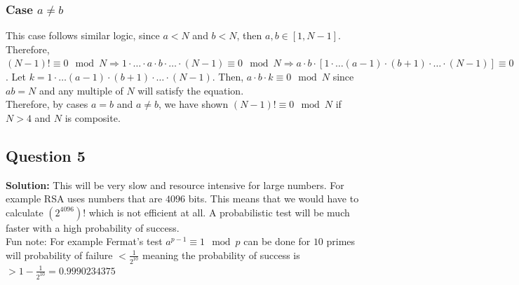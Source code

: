 \documentclass{article}
\begin{document}
\subsubsection*{Case $a\neq b$} This case follows similar logic, since $a < N$ and $b < N$, then $a,b \in [1, N-1]$. Therefore, $(N-1)! \equiv 0 \mod N \Rightarrow 1\cdot \ldots \cdot a \cdot b \cdot \ldots \cdot (N-1) \equiv 0 \mod N \Rightarrow a\cdot b \cdot [1\cdot \ldots (a-1) \cdot (b+1) \cdot \ldots \cdot (N-1)] \equiv 0 \mod N$. Let $k = 1 \cdot \ldots (a-1) \cdot (b+1) \cdot \ldots \cdot (N-1)$. Then, $a\cdot b \cdot k \equiv 0 \mod N$ since $ab = N$ and any multiple of $N$ will satisfy the equation. \\ 

\noindent Therefore, by cases $a=b$ and $a\neq b$, we have shown $(N-1)! \equiv 0 \mod N$ if $N > 4$ and $N$ is composite.

\subsection*{Question 5}
\textbf{Solution:} This will be very slow and resource intensive for large numbers. For example RSA uses numbers that are $4096$ bits. This means that we would have to calculate $(2^{4096})!$ which is not efficient at all. A probabilistic test will be much faster with a high probability of success. \\

\noindent Fun note: For example Fermat's test $a^{p-1} \equiv 1 \mod p$ can be done for $10$ primes will probability of failure $< \frac{1}{2^{10}}$ meaning the probability of success is $ > 1 - \frac{1}{2^{10}} = 0.9990234375$
\end{document}
